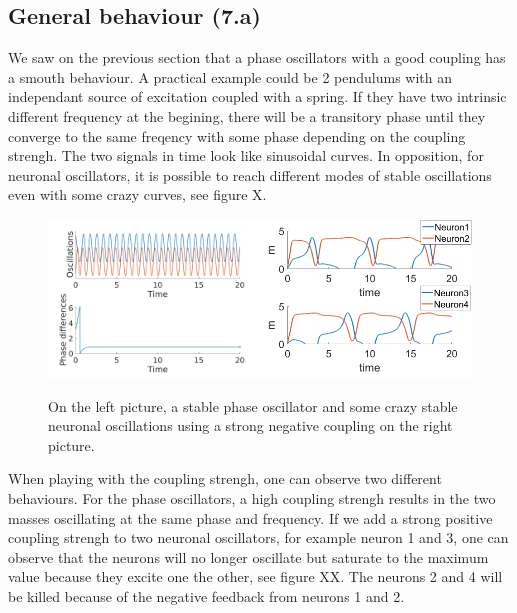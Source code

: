\documentclass[a4paper]{scrartcl}
\begin{document}
\subsection{General behaviour (7.a)}

We saw  on the previous section that a phase oscillators with a good coupling has a smouth behaviour. A practical example could be 2 pendulums with an independant source of excitation coupled with a spring. If they have two intrinsic different frequency at the begining, there will be a transitory phase until they converge to the same freqency with some phase depending on the coupling strengh. The two signals in time look like sinusoidal curves. In opposition, for neuronal oscillators, it is possible to reach different modes of stable oscillations even with some crazy curves, see figure X.

\begin{figure}[!h]
	\centering
	\includegraphics[width=0.5\textwidth]{fig/2phase.png}\includegraphics[width=0.5\textwidth]{fig/crazy.png}
	\caption{On the left picture, a stable phase oscillator and some crazy stable neuronal oscillations using a strong negative coupling on the right picture.}
\end{figure}

\newpage
When playing with the coupling strengh, one can observe two different behaviours. For the phase oscillators, a high coupling strengh results in the two masses oscillating at the same phase and frequency. If we add a strong positive coupling strengh to two neuronal oscillators, for example neuron 1 and 3, one can observe that the neurons will no longer oscillate but saturate to the maximum value because they excite one the other, see figure XX. The neurons 2 and 4 will be killed because of the negative feedback from neurons 1 and 2.
\end{document}
